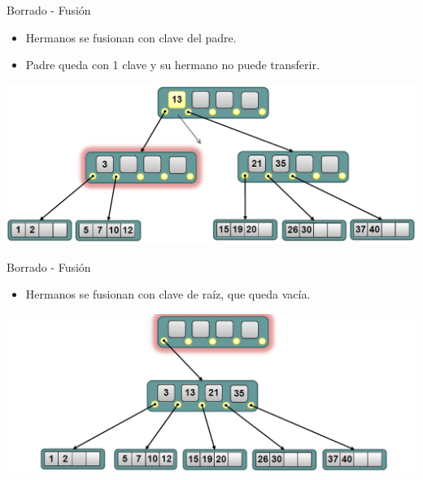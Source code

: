 \documentclass[handout]{beamer} %
\begin{document}
\begin{frame}{Borrado - Fusión}
    \vspace{-2ex}
    
    {\small
    \begin{itemize}
        \item Hermanos se fusionan con clave del padre.\\[-1ex]
        \item Padre queda con 1 clave y su hermano no puede transferir.
    \end{itemize}}
    \vspace{-3ex}
    
    \begin{center}
        \includegraphics[width=\textwidth]{./image/cap3/b-tree-delete10}
    \end{center}
\end{frame}

\begin{frame}{Borrado - Fusión}
    \begin{itemize}
        \item Hermanos se fusionan con clave de raíz, que queda vacía.
    \end{itemize}
    \begin{center}
        \includegraphics[width=\textwidth]{./image/cap3/b-tree-delete11}
    \end{center}
\end{frame}
\end{document}
